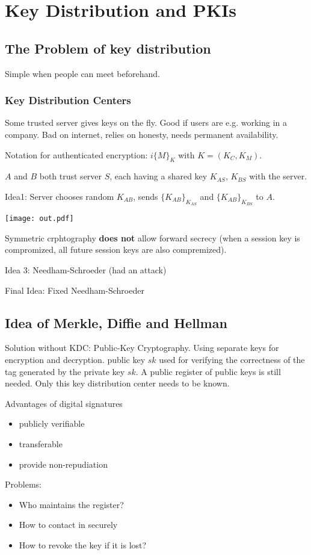 \documentclass[11pt]{article}
\author{Silvan Mosberger}
\date{\today}
\title{}
\begin{document}
\tableofcontents

\section{Key Distribution and PKIs}
\label{sec:org363c467}

\subsection{The Problem of key distribution}
\label{sec:orgd43167e}

Simple when people can meet beforehand.

\subsubsection{Key Distribution Centers}
\label{sec:org1a16905}

Some trusted server gives keys on the fly. Good if users are e.g. working in a company. Bad on internet, relies on honesty, needs permanent availability.

Notation for authenticated encryption: \(i\{M\}_K\) with \(K = (K_C, K_M)\).

\(A\) and \(B\) both trust server \(S\), each having a shared key \(K_{AS}\), \(K_{BS}\) with the server.

Idea1: Server chooses random \(K_{AB}\), sends \(\{K_{AB}\}_{K_{AS}}\) and \(\{K_{AB}\}_{K_{BS}}\) to \(A\).

\begin{center}
\texttt{[image: out.pdf]}
\end{center}

Symmetric crphtography \textbf{does not} allow forward secrecy (when a session key is compromized, all future session keys are also compremized).

Idea 3: Needham-Schroeder (had an attack)

Final Idea: Fixed Needham-Schroeder

\subsection{Idea of Merkle, Diffie and Hellman}
\label{sec:org24ceefc}

Solution without KDC: Public-Key Cryptography. Using separate keys for encryption and decryption. public key \(sk\) used for verifying the correctness of the tag generated by the private key \(sk\). A public register of public keys is still needed. Only this key distribution center needs to be known.

Advantages of digital signatures
\begin{itemize}
\item publicly verifiable
\item transferable
\item provide non-repudiation
\end{itemize}

Problems:
\begin{itemize}
\item Who maintains the register?
\item How to contact in securely
\item How to revoke the key if it is lost?
\end{itemize}
\end{document}
